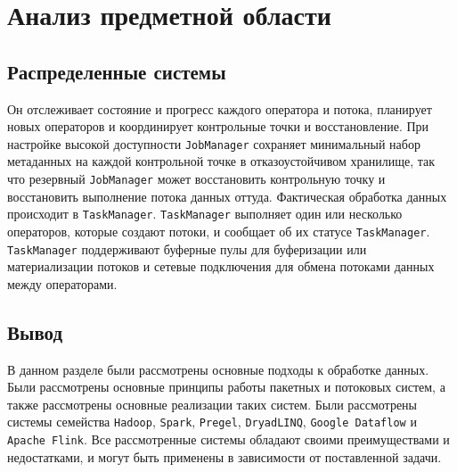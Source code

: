 \section{Анализ предметной области}

\subsection{Распределенные системы}
Он отслеживает состояние и прогресс каждого оператора и потока, планирует новых операторов и координирует контрольные точки и восстановление.
При настройке высокой доступности \texttt{JobManager} сохраняет минимальный набор метаданных на каждой контрольной точке в отказоустойчивом хранилище, так что резервный \texttt{JobManager} может восстановить контрольную точку и восстановить выполнение потока данных оттуда. 
Фактическая обработка данных происходит в \texttt{TaskManager}.
\texttt{TaskManager} выполняет один или несколько операторов, которые создают потоки, и сообщает об их статусе \texttt{TaskManager}. 
\texttt{TaskManager} поддерживают буферные пулы для буферизации или материализации потоков и сетевые подключения для обмена потоками данных между операторами.

\subsection*{Вывод}

В данном разделе были рассмотрены основные подходы к обработке данных. 
Были рассмотрены основные принципы работы пакетных и потоковых систем, а также рассмотрены основные реализации таких систем. 
Были рассмотрены системы семейства \texttt{Hadoop}, \texttt{Spark}, \texttt{Pregel}, \texttt{DryadLINQ}, \texttt{Google Dataflow} и \texttt{Apache Flink}. 
Все рассмотренные системы обладают своими преимуществами и недостатками, и могут быть применены в зависимости от поставленной задачи. 

\clearpage
